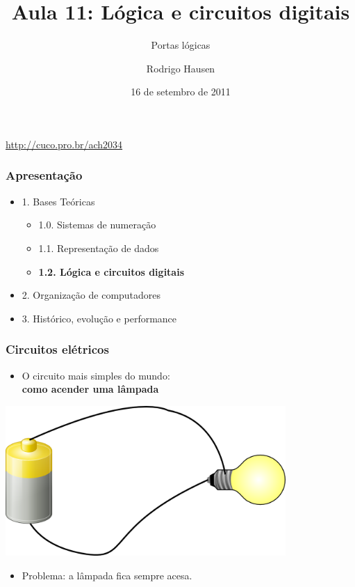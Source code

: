 \documentclass{beamer}
\title{Aula 11: Lógica e circuitos digitais}
\subtitle{Portas lógicas}
\author{Rodrigo Hausen}
\institute{\url{hausen@usp.br}}
\date{16 de setembro de 2011}
\begin{document}
\begin{frame}
\maketitle

\vspace{-1cm}

\begin{center}
\url{http://cuco.pro.br/ach2034}
\end{center}

\end{frame}


\begin{frame}
\frametitle{Apresentação}

\begin{itemize}
\item 1. Bases Teóricas
\begin{itemize}
\item 1.0. Sistemas de numeração
\item 1.1. Representação de dados
\item {\color{blue} \textbf{1.2. Lógica e circuitos digitais}}
\end{itemize}
\item 2. Organização de computadores
\item 3. Histórico, evolução e performance
\end{itemize}

\end{frame}


\begin{frame}
 \frametitle{Circuitos elétricos}

\begin{itemize}
    \item O circuito mais simples do mundo:\\
    \textbf{como acender uma lâmpada}
\end{itemize}

\centering
\includegraphics[width=0.8\textwidth]{images/circsimples.png}

\pause

\begin{itemize}
    \item Problema: a lâmpada fica sempre acesa.
\end{itemize}

\end{frame}
\end{document}
